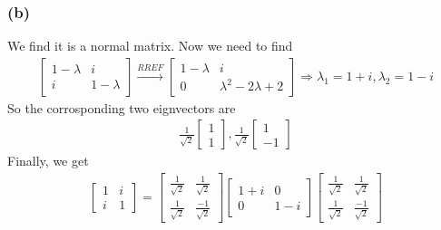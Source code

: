 \documentclass{article}
\begin{document}
\subsubsection*{(b)}
We find it is a normal matrix. Now we need to find 
\begin{equation*}
    \begin{split}
        \begin{bmatrix}
            1 - \lambda & i \\ i & 1 - \lambda
        \end{bmatrix} \stackrel{RREF}{\longrightarrow} \begin{bmatrix}
            1 - \lambda & i \\ 0 & \lambda^2 - 2\lambda + 2
        \end{bmatrix} \Rightarrow \lambda_1 = 1 + i, \lambda_2 = 1 - i 
    \end{split}
\end{equation*}
So the corrosponding two eignvectors are
\begin{equation*}
    \begin{split}
        \frac{1}{\sqrt{2}}\begin{bmatrix}
            1 \\ 1
        \end{bmatrix},
        \frac{1}{\sqrt{2}}\begin{bmatrix}
            1 \\ -1
        \end{bmatrix}
    \end{split}
\end{equation*}
Finally, we get 
\begin{equation*}
    \begin{split}
        \begin{bmatrix}
            1  & i \\ i & 1 
        \end{bmatrix} = \begin{bmatrix}
            \frac{1}{\sqrt{2}} & \frac{1}{\sqrt{2}} \\ \frac{1}{\sqrt{2}} & \frac{-1}{\sqrt{2}}
        \end{bmatrix}\begin{bmatrix}
            1 + i & 0 \\ 0 & 1 - i
        \end{bmatrix}\begin{bmatrix}
            \frac{1}{\sqrt{2}} & \frac{1}{\sqrt{2}} \\ \frac{1}{\sqrt{2}} & \frac{-1}{\sqrt{2}}
        \end{bmatrix}
    \end{split}
\end{equation*}
\end{document}
